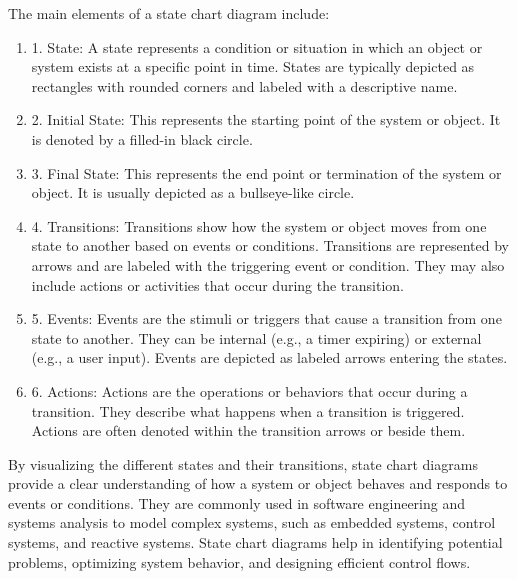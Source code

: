 \documentclass{article}
\begin{document}
The main elements of a state chart diagram include:
\begin{enumerate}
	\item 1. State: A state represents a condition or situation in which an object or system exists at a specific point in time. States are typically depicted as rectangles with rounded corners and labeled with a descriptive name.
	\item 2. Initial State: This represents the starting point of the system or object. It is denoted by a filled-in black circle.
	\item 3. Final State: This represents the end point or termination of the system or object. It is usually depicted as a bullseye-like circle.
	\item 4. Transitions: Transitions show how the system or object moves from one state to another based on events or conditions. Transitions are represented by arrows and are labeled with the triggering event or condition. They may also include actions or activities that occur during the transition.
	\item 5. Events: Events are the stimuli or triggers that cause a transition from one state to another. They can be internal (e.g., a timer expiring) or external (e.g., a user input). Events are depicted as labeled arrows entering the states.
	\item 6. Actions: Actions are the operations or behaviors that occur during a transition. They describe what happens when a transition is triggered. Actions are often denoted within the transition arrows or beside them.
\end{enumerate}
By visualizing the different states and their transitions, state chart diagrams provide a clear understanding of how a system or object behaves and responds to events or conditions. They are commonly used in software engineering and systems analysis to model complex systems, such as embedded systems, control systems, and reactive systems. State chart diagrams help in identifying potential problems, optimizing system behavior, and designing efficient control flows.
\end{document}
